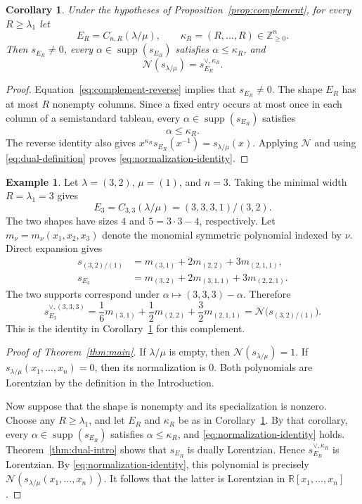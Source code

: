 \documentclass[11pt]{article}
\newtheorem{corollary}[theorem]{Corollary}
\theoremstyle{definition}
\newtheorem{example}[theorem]{Example}
\newcommand{\Nop}{\mathcal N}
\newcommand{\R}{\mathbb R}
\newcommand{\Znonneg}{\mathbb Z_{\ge0}}
\newcommand{\supp}{\operatorname{supp}}
\begin{document}
\par\medskip
\begin{corollary}\label{cor:normalization}
Under the hypotheses of Proposition~\ref{prop:complement}, for every
$R\ge\lambda_1$ let
\[
  E_R=C_{n,R}(\lambda/\mu),
  \qquad
  \kappa_R=(R,\ldots,R)\in\Znonneg^n.
\]
Then $s_{E_R}\ne0$, every $\alpha\in\supp(s_{E_R})$ satisfies
$\alpha\le\kappa_R$, and
\begin{equation}\label{eq:normalization-identity}
  \Nop(s_{\lambda/\mu})=s_{E_R}^{\vee,\kappa_R}.
\end{equation}
\end{corollary}

\begin{proof}
Equation~\eqref{eq:complement-reverse} implies that $s_{E_R}\ne0$.  The shape
$E_R$ has at most $R$ nonempty columns.  Since a fixed entry occurs at most
once in each column of a semistandard tableau, every
$\alpha\in\supp(s_{E_R})$ satisfies
\[
  \alpha\le\kappa_R.
\]
The reverse identity also gives
$x^{\kappa_R}s_{E_R}(x^{-1})=s_{\lambda/\mu}(x)$.  Applying $\Nop$ and using
\eqref{eq:dual-definition} proves \eqref{eq:normalization-identity}.
\end{proof}

\begin{example}\label{ex:complement}
Let $\lambda=(3,2)$, $\mu=(1)$, and $n=3$.  Taking the minimal width
$R=\lambda_1=3$ gives
\[
  E_3=C_{3,3}(\lambda/\mu)=(3,3,3,1)/(3,2).
\]
The two shapes have sizes $4$ and $5=3\cdot3-4$, respectively.  Let
$m_\nu=m_\nu(x_1,x_2,x_3)$ denote the monomial symmetric polynomial indexed
by $\nu$.  Direct expansion gives
\begin{align*}
  s_{(3,2)/(1)}
  &=m_{(3,1)}+2m_{(2,2)}+3m_{(2,1,1)},\\
  s_{E_3}
  &=m_{(3,2)}+2m_{(3,1,1)}+3m_{(2,2,1)}.
\end{align*}
The two supports correspond under
$\alpha\mapsto(3,3,3)-\alpha$.  Therefore
\[
  s_{E_3}^{\vee,(3,3,3)}
  =\frac{1}{6}m_{(3,1)}
   +\frac{1}{2}m_{(2,2)}
   +\frac{3}{2}m_{(2,1,1)}
  =\Nop\bigl(s_{(3,2)/(1)}\bigr).
\]
This is the identity in Corollary~\ref{cor:normalization} for this
complement.
\end{example}

\begin{proof}[Proof of Theorem~\ref{thm:main}]
If $\lambda/\mu$ is empty, then $\Nop(s_{\lambda/\mu})=1$.  If
$s_{\lambda/\mu}(x_1,\ldots,x_n)=0$, then its normalization is $0$.
Both polynomials are Lorentzian by the definition in the Introduction.

Now suppose that the shape is nonempty and its specialization is nonzero.
Choose any $R\ge\lambda_1$, and let $E_R$ and $\kappa_R$ be as in
Corollary~\ref{cor:normalization}.  By that corollary, every
$\alpha\in\supp(s_{E_R})$ satisfies $\alpha\le\kappa_R$, and
\eqref{eq:normalization-identity} holds.  Theorem~\ref{thm:dual-intro} shows
that $s_{E_R}$ is dually Lorentzian.  Hence
$s_{E_R}^{\vee,\kappa_R}$ is Lorentzian.  By
\eqref{eq:normalization-identity}, this polynomial is precisely
$\Nop(s_{\lambda/\mu}(x_1,\ldots,x_n))$.  It follows that the latter is
Lorentzian in
$\R[x_1,\ldots,x_n]$.
\end{proof}
\end{document}
